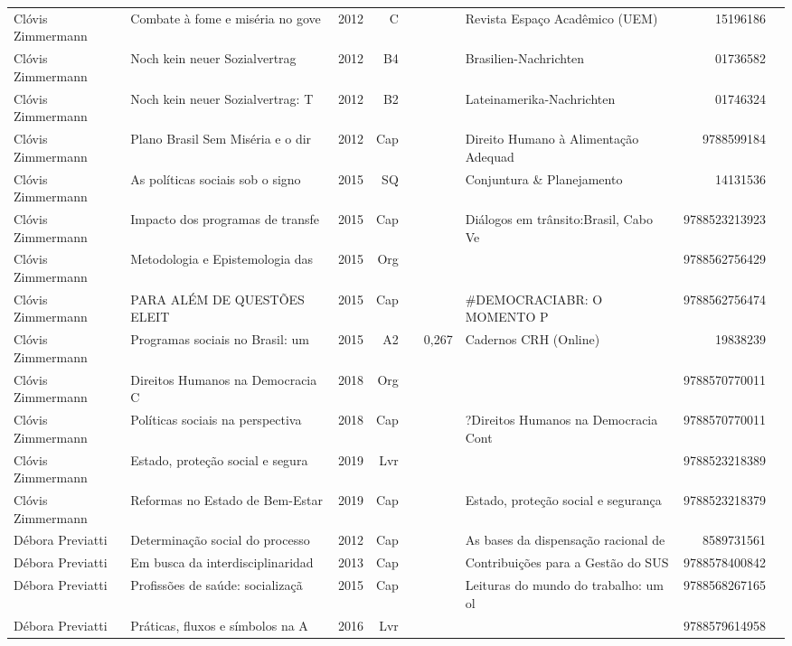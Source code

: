 \documentclass[12pt,brazil]{article}\usepackage[]{graphicx}\usepackage[]{xcolor}
\begin{document}
\begin{longtable}{lllrrllrr}
Clóvis Zimmermann & Combate à fome e miséria no gove & 2012 & C &  &  & Revista Espaço Acadêmico (UEM) & 15196186 \\
Clóvis Zimmermann & Noch kein neuer Sozialvertrag & 2012 & B4 &  &  & Brasilien-Nachrichten & 01736582 \\
Clóvis Zimmermann & Noch kein neuer Sozialvertrag: T & 2012 & B2 &  &  & Lateinamerika-Nachrichten & 01746324 \\
Clóvis Zimmermann & Plano Brasil Sem Miséria e o dir & 2012 & Cap &  &  & Direito Humano à Alimentação Adequad & 9788599184 \\
Clóvis Zimmermann & As políticas sociais sob o signo & 2015 & SQ &  &  & Conjuntura \& Planejamento & 14131536 \\
Clóvis Zimmermann & Impacto dos programas de transfe & 2015 & Cap &  &  & Diálogos em trânsito:Brasil, Cabo Ve & 9788523213923 \\
Clóvis Zimmermann & Metodologia e Epistemologia das  & 2015 & Org &  &  &  & 9788562756429 \\
Clóvis Zimmermann & PARA ALÉM DE QUESTÕES ELEIT & 2015 & Cap &  &  & \#DEMOCRACIABR: O MOMENTO P & 9788562756474 \\
Clóvis Zimmermann & Programas sociais no Brasil: um  & 2015 & A2 &  & 0,267 & Cadernos CRH (Online) & 19838239 \\
Clóvis Zimmermann & Direitos Humanos na Democracia C & 2018 & Org &  &  &  & 9788570770011 \\
Clóvis Zimmermann & Políticas sociais na perspectiva & 2018 & Cap &  &  & ?Direitos Humanos na Democracia Cont & 9788570770011 \\
\rowcolor{ninval}Clóvis Zimmermann & Estado, proteção social e segura & 2019 & Lvr &  &  &  & 9788523218389 \\
Clóvis Zimmermann & Reformas no Estado de Bem-Estar  & 2019 & Cap &  &  & Estado, proteção social e segurança  & 9788523218379 \\
Débora Previatti & Determinação social do processo  & 2012 & Cap &  &  & As bases da dispensação racional de  & 8589731561 \\
Débora Previatti & Em busca da interdisciplinaridad & 2013 & Cap &  &  & Contribuições para a Gestão do SUS & 9788578400842 \\
Débora Previatti & Profissões de saúde: socializaçã & 2015 & Cap &  &  & Leituras do mundo do trabalho: um ol & 9788568267165 \\
Débora Previatti & Práticas, fluxos e símbolos na A & 2016 & Lvr &  &  &  & 9788579614958 \\

\end{longtable}
\end{document}

